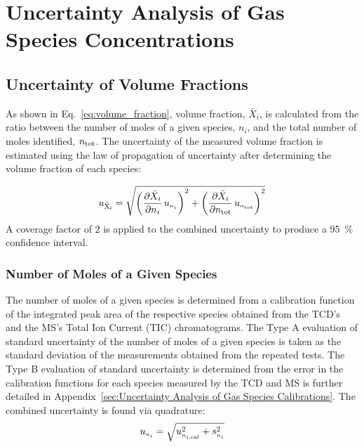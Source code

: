 \documentclass[12pt]{article}
\begin{document}
\pagebreak

\section{Uncertainty Analysis of Gas Species Concentrations} \label{sec:UncertaintyGasSpecies}

\subsection{Uncertainty of Volume Fractions} \label{sec:UncertaintyMoleFrac}
As shown in Eq.~\ref{eq:volume_fraction}, volume fraction, $\bar{X}_{i}$, is calculated from the ratio between the number of moles of a given species, $n_{i}$, and the total number of moles identified, $n_{\rm tot}$. The uncertainty of the measured volume fraction is estimated using the law of propagation of uncertainty after determining the volume fraction of each species:

\begin{equation}
\label{eq:Volume_Frac_Uncertainty}
u_\mathrm{\bar{X}_{i}} = \sqrt{{\left( \frac{\partial \bar{X}_{i}}{\partial n_{i}}\,u_{\scriptscriptstyle n_{i}} \right)}^2+{\left(\frac{\partial \bar{X}_{i}}{\partial n_{\rm tot}}\,u_{\scriptscriptstyle n_{\rm tot}}\right)}^2}
\end{equation}
A coverage factor of 2 is applied to the combined uncertainty to produce a 95~\% confidence interval.

\subsubsection{Number of Moles of a Given Species}
\label{ssec:Number_of_Moles_of_a_Given_Species}

The number of moles of a given species is determined from a calibration function of the integrated peak area of the respective species obtained from the TCD's and the MS's Total Ion Current (TIC) chromatograms. The Type A evaluation of standard uncertainty of the number of moles of a given species is taken as the standard deviation of the measurements obtained from the repeated tests. The Type B evaluation of standard uncertainty is determined from the error in the calibration functions for each species measured by the TCD and MS is further detailed in Appendix~\ref{sec:Uncertainty Analysis of Gas Species Calibrations}. The combined uncertainty is found via quadrature:
\begin{equation}
\label{eq:gasspeciesuncertaintycertainty}
u_{\scriptscriptstyle n_{i}} = \sqrt{ u_{\scriptscriptstyle n_{i,\rm cal}}^2 + s_{\scriptscriptstyle n_{i}}^2}
\end{equation}
\end{document}

